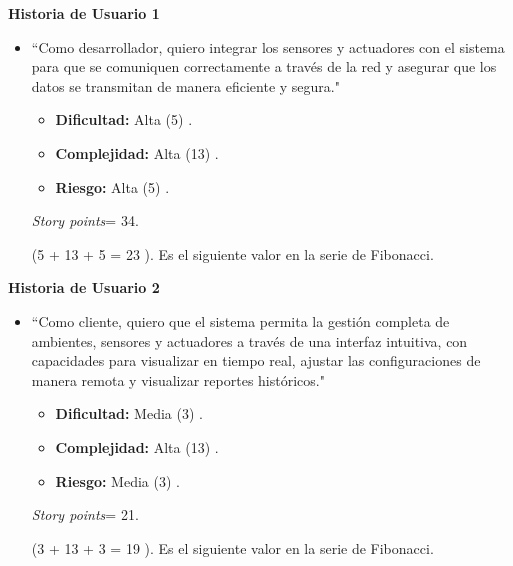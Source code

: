 \textbf{Historia de Usuario 1 }
\begin{itemize}
	\item ``Como desarrollador, quiero integrar los sensores y actuadores con el sistema para que se comuniquen correctamente a través de la
	      red y asegurar que los datos se transmitan de manera eficiente y segura."

	      \begin{itemize}
		      \item \textbf{Dificultad:} Alta (5) .
		      \item \textbf{Complejidad:} Alta (13) .
		      \item \textbf{Riesgo:} Alta (5) .
	      \end{itemize}

	      \textit{Story points}= 34.

	      (5 + 13 + 5 = 23 ). Es el siguiente valor en la serie de Fibonacci.

\end{itemize}

\textbf{Historia de Usuario 2 }
\begin{itemize}
	\item ``Como cliente, quiero que el sistema permita la gestión completa de ambientes, sensores y actuadores a través de una interfaz intuitiva,
	      con capacidades para visualizar en tiempo real, ajustar las configuraciones de manera remota y visualizar
	      reportes históricos."

	      \begin{itemize}
		      \item \textbf{Dificultad:} Media (3) .
		      \item \textbf{Complejidad:} Alta (13) .
		      \item \textbf{Riesgo:} Media (3) .
	      \end{itemize}

	      \textit{Story points}= 21.

	      (3 + 13 + 3 = 19 ). Es el siguiente valor en la serie de Fibonacci.

\end{itemize}

